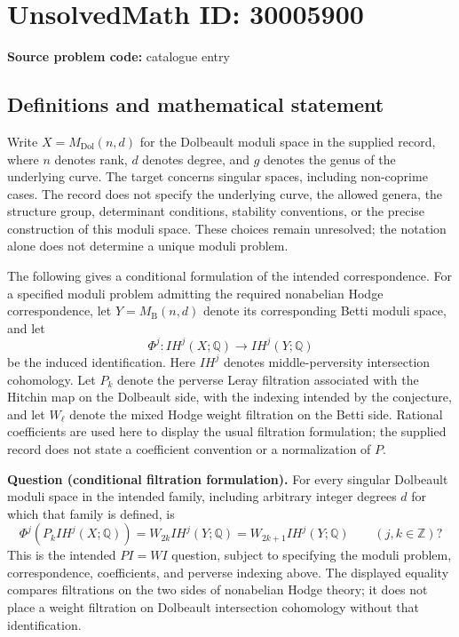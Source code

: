 \documentclass[11pt]{article}
\newcommand{\Z}{\mathbb{Z}}
\newcommand{\Q}{\mathbb{Q}}
\begin{document}
\section*{UnsolvedMath ID: 30005900}
\textbf{Source problem code:} catalogue entry
\subsection{Definitions and mathematical statement}
Write \(X=M_{\mathrm{Dol}}(n,d)\) for the Dolbeault moduli space in the supplied record, where \(n\) denotes rank, \(d\) denotes degree, and \(g\) denotes the genus of the underlying curve. The target concerns singular spaces, including non-coprime cases. The record does not specify the underlying curve, the allowed genera, the structure group, determinant conditions, stability conventions, or the precise construction of this moduli space. These choices remain unresolved; the notation alone does not determine a unique moduli problem.

The following gives a conditional formulation of the intended correspondence. For a specified moduli problem admitting the required nonabelian Hodge correspondence, let \(Y=M_{\mathrm{B}}(n,d)\) denote its corresponding Betti moduli space, and let
\[
\Phi^j:IH^j(X;\Q)\longrightarrow IH^j(Y;\Q)
\]
be the induced identification. Here \(IH^j\) denotes middle-perversity intersection cohomology. Let \(P_k\) denote the perverse Leray filtration associated with the Hitchin map on the Dolbeault side, with the indexing intended by the conjecture, and let \(W_\ell\) denote the mixed Hodge weight filtration on the Betti side. Rational coefficients are used here to display the usual filtration formulation; the supplied record does not state a coefficient convention or a normalization of \(P\).

\textbf{Question (conditional filtration formulation).} For every singular Dolbeault moduli space in the intended family, including arbitrary integer degrees \(d\) for which that family is defined, is
\[
\Phi^j\!\left(P_k IH^j(X;\Q)\right)
 =W_{2k}IH^j(Y;\Q)
 =W_{2k+1}IH^j(Y;\Q)
\qquad(j,k\in\Z)?
\]
This is the intended \(PI=WI\) question, subject to specifying the moduli problem, correspondence, coefficients, and perverse indexing above. The displayed equality compares filtrations on the two sides of nonabelian Hodge theory; it does not place a weight filtration on Dolbeault intersection cohomology without that identification.
\end{document}
